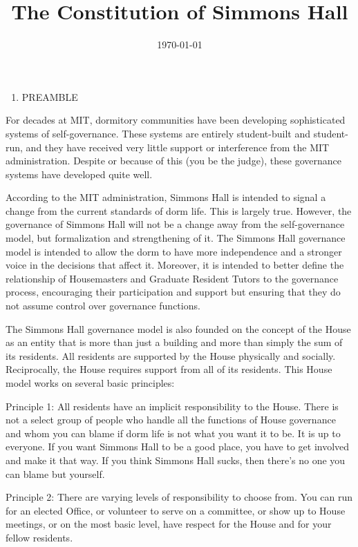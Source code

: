 \documentclass[letterpaper]{article}
\title{The Constitution of Simmons Hall}
\date{\today} %
\begin{document}
\maketitle

\begin{enumerate}
\item PREAMBLE\setcounter{page}{1}\pagestyle{Standard}
\end{enumerate}

For decades at MIT, dormitory communities have been developing sophisticated systems of self-governance. These systems are entirely student-built and student-run, and they have received very little support or interference from the MIT administration. Despite or because of this (you be the judge), these governance systems have developed quite well.

According to the MIT administration, Simmons Hall is intended to signal a change from the current standards of dorm life. This is largely true. However, the governance of Simmons Hall will not be a change away from the self-governance model, but formalization and strengthening of it. The Simmons Hall governance model is intended to allow the dorm to have more independence and a stronger voice in the decisions that affect it. Moreover, it is intended to better define the relationship of Housemasters and Graduate Resident Tutors to the governance process, encouraging their participation and support but ensuring that they do not assume control over governance functions.

The Simmons Hall governance model is also founded on the concept of the House as an entity that is more than just a building and more than simply the sum of its residents. All residents are supported by the House physically and socially. Reciprocally, the House requires support from all of its residents. This House model works on several basic principles:

Principle 1: All residents have an implicit responsibility to the House. There is not a select group of people who handle all the functions of House governance and whom you can blame if dorm life is not what you want it to be. It is up to everyone. If you want Simmons Hall to be a good place, you have to get involved and make it that way. If you think Simmons Hall sucks, then there's no one you can blame but yourself.

Principle 2: There are varying levels of responsibility to choose from. You can run for an elected Office, or volunteer to serve on a committee, or show up to House meetings, or on the most basic level, have respect for the House and for your fellow residents.
\end{document}
